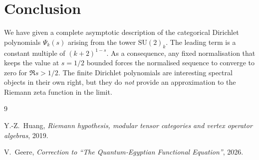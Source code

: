 \documentclass[11pt,a4paper]{article}
\theoremstyle{definition}
\theoremstyle{remark}
\begin{document}
\section{Conclusion}

We have given a complete asymptotic description of the categorical Dirichlet polynomials
$\Psi_k(s)$ arising from the tower $\mathrm{SU}(2)_k$.
The leading term is a constant multiple of $(k+2)^{1-s}$.
As a consequence, any fixed normalisation that keeps the value at $s=1/2$ bounded forces
the normalised sequence to converge to zero for $\Re s>1/2$.
The finite Dirichlet polynomials are interesting spectral objects in their own right,
but they do \emph{not} provide an approximation to the Riemann zeta function in the limit.

\begin{thebibliography}{9}

Y.-Z.~Huang, \emph{Riemann hypothesis, modular tensor categories and vertex operator algebras},
2019.

V.~Geere, \emph{Correction to ``The Quantum‑Egyptian Functional Equation''}, 2026.

\end{thebibliography}
\end{document}
